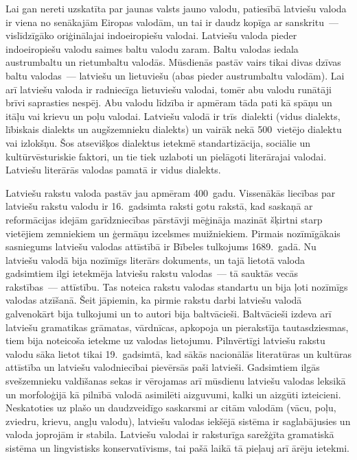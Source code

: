 \begin{multicols}{2}
Lai gan nereti uzskatīta par jaunas valsts jauno valodu, patiesībā latviešu valoda ir viena no senākajām Eiropas valodām, un tai ir daudz kopīga ar sanskritu~--- vislīdzīgāko oriģinālajai indoeiropiešu valodai.
Latviešu valoda pieder indoeiropiešu valodu saimes baltu valodu zaram.
Baltu valodas iedala austrumbaltu un rietumbaltu valodās.
Mūsdienās pastāv vairs tikai divas dzīvas baltu valodas~--- latviešu un lietuviešu (abas pieder austrumbaltu valodām).
Lai arī latviešu valoda ir radniecīga lietuviešu valodai, tomēr abu valodu runātāji brīvi saprasties nespēj.
Abu valodu līdzība ir apmēram tāda pati kā spāņu un itāļu vai krievu un poļu valodai.
Latviešu valodā ir trīs~dialekti (vidus dialekts, lībiskais dialekts un augšzemnieku dialekts) un vairāk nekā 500~vietējo dialektu vai izlokšņu.
Šos atsevišķos dialektus ietekmē standartizācija, sociālie un kultūrvēsturiskie faktori, un tie tiek uzlaboti un pielāgoti literārajai valodai.
Latviešu literārās valodas pamatā ir vidus dialekts. 

Latviešu rakstu valoda pastāv jau apmēram 400~gadu.
Vissenākās liecības par latviešu rakstu valodu ir 16.~gadsimta raksti gotu rakstā, kad saskaņā ar reformācijas idejām garīdzniecības pārstāvji mēģināja mazināt šķirtni starp vietējiem zemniekiem un ģermāņu izcelsmes muižniekiem.
Pirmais nozīmīgākais sasniegums latviešu valodas attīstībā ir Bībeles tulkojums 1689.~gadā.
Nu latviešu valodā bija nozīmīgs literārs dokuments, un tajā lietotā valoda gadsimtiem ilgi ietekmēja latviešu rakstu valodas~--- tā sauktās vecās rakstības~--- attīstību.
Tas noteica rakstu valodas standartu un bija ļoti nozīmīgs valodas atzīšanā.
Šeit jāpiemin, ka pirmie rakstu darbi latviešu valodā galvenokārt bija tulkojumi un to autori bija baltvācieši.
Baltvācieši izdeva arī latviešu gramatikas grāmatas, vārdnīcas, apkopoja un pierakstīja tautasdziesmas, tiem bija noteicoša ietekme uz valodas lietojumu. 
Pilnvērtīgi latviešu rakstu valodu sāka lietot tikai 19.~gadsimtā, kad sākās nacionālās literatūras un kultūras attīstība un latviešu valodniecībai pievērsās paši latvieši. 
Gadsimtiem ilgās svešzemnieku valdīšanas sekas ir vērojamas arī mūsdienu latviešu valodas leksikā un morfoloģijā kā pilnībā valodā asimilēti aizguvumi, kalki un aizgūti izteicieni. 
Neskatoties uz plašo un daudzveidīgo saskarsmi ar citām valodām (vācu, poļu, zviedru, krievu, angļu valodu), latviešu valodas iekšējā sistēma ir saglabājusies un valoda joprojām ir stabila. 
Latviešu valodai ir raksturīga sarežģīta gramatiskā sistēma un lingvistisks konservatīvisms, tai pašā laikā tā pieļauj arī ārēju ietekmi.


\end{multicols}
